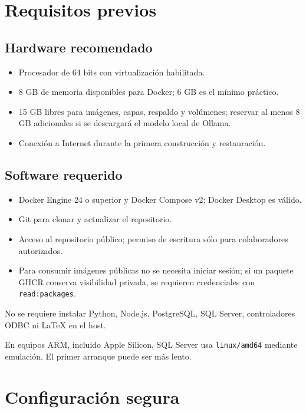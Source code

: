 \documentclass[11pt,letterpaper]{article}
\newcommand{\file}[1]{\texttt{#1}}
\begin{document}
\section{Requisitos previos}

\subsection{Hardware recomendado}

\begin{itemize}
  \item Procesador de 64 bits con virtualización habilitada.
  \item 8 GB de memoria disponibles para Docker; 6 GB es el mínimo práctico.
  \item 15 GB libres para imágenes, capas, respaldo y volúmenes; reservar al menos 8 GB adicionales si se descargará el modelo local de Ollama.
  \item Conexión a Internet durante la primera construcción y restauración.
\end{itemize}

\subsection{Software requerido}

\begin{itemize}
  \item Docker Engine 24 o superior y Docker Compose v2; Docker Desktop es válido.
  \item Git para clonar y actualizar el repositorio.
  \item Acceso al repositorio público; permiso de escritura sólo para colaboradores autorizados.
  \item Para consumir imágenes públicas no se necesita iniciar sesión; si un paquete GHCR conserva visibilidad privada, se requieren credenciales con \file{read:packages}.
\end{itemize}

No se requiere instalar Python, Node.js, PostgreSQL, SQL Server, controladores ODBC ni LaTeX en el host.

En equipos ARM, incluido Apple Silicon, SQL Server usa \file{linux/amd64} mediante emulación. El primer arranque puede ser más lento.

\section{Configuración segura}
\end{document}
